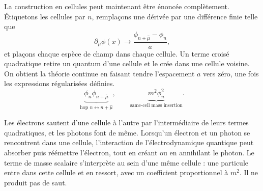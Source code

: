 \begin{classroomqa}
\end{classroomqa}

La construction en cellules peut maintenant être énoncée complètement. Étiquetons les cellules par \(n\), remplaçons une dérivée par une différence finie telle que
\begin{equation}
\partial_\mu\phi(x)
\longrightarrow
\frac{\phi_{n+\hat\mu}-\phi_n}{a},
\end{equation}
et plaçons chaque espèce de champ dans chaque cellule. Un terme croisé quadratique retire un quantum d’une cellule et le crée dans une cellule voisine. On obtient la théorie continue en faisant tendre l’espacement \(a\) vers zéro, une fois les expressions régularisées définies.
\begin{equation}
\underbrace{\phi_n\phi_{n+\hat\mu}}_{\text{hop }n\leftrightarrow n+\hat\mu},
\qquad
\underbrace{m^2\phi_n^2}_{\text{same-cell mass insertion}}.
\end{equation}

\begin{classroomqa}
\end{classroomqa}

Les électrons sautent d’une cellule à l’autre par l’intermédiaire de leurs termes quadratiques, et les photons font de même. Lorsqu’un électron et un photon se rencontrent dans une cellule, l’interaction de l’électrodynamique quantique peut absorber puis réémettre l’électron, tout en créant ou en annihilant le photon. Le terme de masse scalaire s’interprète au sein d’une même cellule : une particule entre dans cette cellule et en ressort, avec un coefficient proportionnel à \(m^2\). Il ne produit pas de saut.

